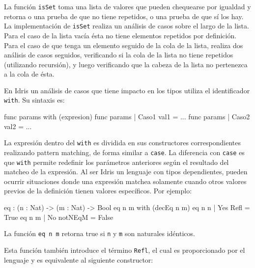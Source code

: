
La función \texttt{isSet} toma una lista de valores que pueden chequearse por igualdad y retorna o una prueba de que no tiene repetidos, o una prueba de que sí los hay. La implementación de \texttt{isSet} realiza un análisis de casos sobre el largo de la lista. Para el caso de la lista vacía ésta no tiene elementos repetidos por definición. Para el caso de que tenga un elemento seguido de la cola de la lista, realiza dos análisis de casos seguidos, verificando si la cola de la lista no tiene repetidos (utilizando recursión), y luego verificando que la cabeza de la lista no pertenezca a la cola de ésta.

En Idris un análisis de casos que tiene impacto en los tipos utiliza el identificador \texttt{with}. Su sintaxis es:

\begin{code}
func params with (expresion)
  func params | Caso1 val1 = ...
  func params | Caso2 val2 = ...
\end{code}

La expresión dentro del \texttt{with} es dividida en sus constructores correspondientes realizando pattern matching, de forma similar a \texttt{case}. La diferencia con \texttt{case} es que \texttt{with} permite redefinir los parámetros anteriores según el resultado del matcheo de la expresión. Al ser Idris un lenguaje con tipos dependientes, pueden ocurrir situaciones donde una expresión matchea solamente cuando otros valores previos de la definición tienen valores específicos. Por ejemplo:

\begin{code}
eq : (n : Nat) -> (m : Nat) -> Bool
eq n m with (decEq n m)
  eq n n | Yes Refl = True
  eq n m | No notNEqM = False
\end{code}

La función \texttt{eq n m} retorna true si \texttt{n} y \texttt{m} son naturales idénticos.

Esta función también introduce el término \texttt{Refl}, el cual es proporcionado por el lenguaje y es equivalente al siguiente constructor:

